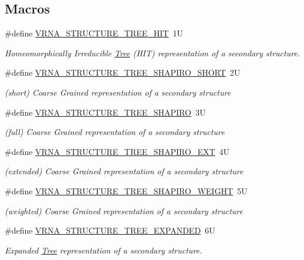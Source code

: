 \subsection*{Macros}
\begin{DoxyCompactItemize}
\item 
\#define \mbox{\hyperlink{group__struct__utils__tree_ga3ad5609bc93ef20034c3ab989365c1f0}{V\+R\+N\+A\+\_\+\+S\+T\+R\+U\+C\+T\+U\+R\+E\+\_\+\+T\+R\+E\+E\+\_\+\+H\+IT}}~1U
\begin{DoxyCompactList}\small\item\em Homeomorphically Irreducible \mbox{\hyperlink{structTree}{Tree}} (H\+IT) representation of a secondary structure. \end{DoxyCompactList}\item 
\#define \mbox{\hyperlink{group__struct__utils__tree_ga549e259a963d77e2d5b7e14083fc016e}{V\+R\+N\+A\+\_\+\+S\+T\+R\+U\+C\+T\+U\+R\+E\+\_\+\+T\+R\+E\+E\+\_\+\+S\+H\+A\+P\+I\+R\+O\+\_\+\+S\+H\+O\+RT}}~2U
\begin{DoxyCompactList}\small\item\em (short) Coarse Grained representation of a secondary structure \end{DoxyCompactList}\item 
\#define \mbox{\hyperlink{group__struct__utils__tree_ga4acd9991a0250ccd4cd44c4725b31927}{V\+R\+N\+A\+\_\+\+S\+T\+R\+U\+C\+T\+U\+R\+E\+\_\+\+T\+R\+E\+E\+\_\+\+S\+H\+A\+P\+I\+RO}}~3U
\begin{DoxyCompactList}\small\item\em (full) Coarse Grained representation of a secondary structure \end{DoxyCompactList}\item 
\#define \mbox{\hyperlink{group__struct__utils__tree_ga8666a10982a4f7a26892066ff07b4b48}{V\+R\+N\+A\+\_\+\+S\+T\+R\+U\+C\+T\+U\+R\+E\+\_\+\+T\+R\+E\+E\+\_\+\+S\+H\+A\+P\+I\+R\+O\+\_\+\+E\+XT}}~4U
\begin{DoxyCompactList}\small\item\em (extended) Coarse Grained representation of a secondary structure \end{DoxyCompactList}\item 
\#define \mbox{\hyperlink{group__struct__utils__tree_ga91f2e3a3a502d5445fd7fe5983a5fe92}{V\+R\+N\+A\+\_\+\+S\+T\+R\+U\+C\+T\+U\+R\+E\+\_\+\+T\+R\+E\+E\+\_\+\+S\+H\+A\+P\+I\+R\+O\+\_\+\+W\+E\+I\+G\+HT}}~5U
\begin{DoxyCompactList}\small\item\em (weighted) Coarse Grained representation of a secondary structure \end{DoxyCompactList}\item 
\#define \mbox{\hyperlink{group__struct__utils__tree_gab3b65489d1322da65d3a3e53242307ef}{V\+R\+N\+A\+\_\+\+S\+T\+R\+U\+C\+T\+U\+R\+E\+\_\+\+T\+R\+E\+E\+\_\+\+E\+X\+P\+A\+N\+D\+ED}}~6U
\begin{DoxyCompactList}\small\item\em Expanded \mbox{\hyperlink{structTree}{Tree}} representation of a secondary structure. \end{DoxyCompactList}\end{DoxyCompactItemize}
